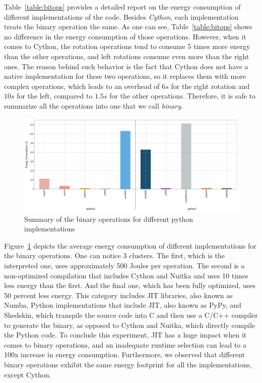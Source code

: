 Table~\ref{table:bitops} provides a detailed report on the energy consumption of different implementations of the code.
Besides \emph{Cython}, each implementation treats the binary operation the same.
As one can see, Table~\ref{table:bitops} shows no difference in the energy consumption of those operations.
However, when it comes to Cython, the rotation operations tend to consume 5 times more energy than the other operations, and left rotations consume even more than the right ones.
The reason behind such behavior is the fact that Cython does not have a native implementation for these two operations, so it replaces them with more complex operations, which leads to an overhead of $6s$ for the right rotation and $10s$ for the left, compared to $1.5s$ for the other operations.
Therefore, it is safe to summarize all the operations into one that we call \emph{binary}.

\begin{figure}
      \centering
      \includegraphics[width=\linewidth]{imgs/bitopts_mean}
      \caption{Summary of the binary operations for different python implementations }
      \label{fig:bitops}
\end{figure}

Figure~\ref{fig:bitops} depicts the average energy consumption of different implementations for the binary operations.
One can notice 3 clusters.
The first, which is the interpreted one, uses approximately 500 Joules per operation.
The second is a non-optimized compilation that includes Cython and Nuitka and uses 10 times less energy than the first.
And the final one, which has been fully optimized, uses 50 percent less energy. This category includes JIT libraries, also known as Numba, Python implementations that include JIT, also known as PyPy, and Shedskin, which transpile the source code into C and then use a C/C++ compiler to generate the binary, as opposed to Cython and Nuitka, which directly compile the Python code.
To conclude this experiment, JIT has a huge impact when it comes to binary operations, and an inadequate runtime selection can lead to a 100x increase in energy consumption.
Furthermore, we observed that different binary operations exhibit the same energy footprint for all the implementations, except Cython.

